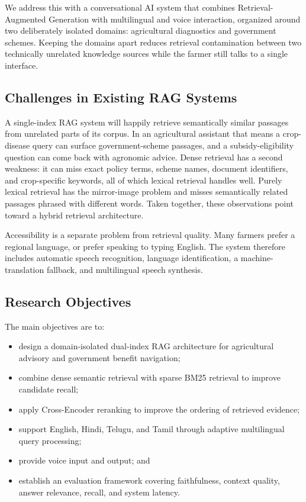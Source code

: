 \documentclass[10pt,twocolumn,letterpaper]{article}
\begin{document}
We address this with a conversational AI system that combines Retrieval-Augmented Generation with multilingual and voice interaction, organized around two deliberately isolated domains: agricultural diagnostics and government schemes. Keeping the domains apart reduces retrieval contamination between two technically unrelated knowledge sources while the farmer still talks to a single interface.

\subsection{Challenges in Existing RAG Systems}
A single-index RAG system will happily retrieve semantically similar passages from unrelated parts of its corpus. In an agricultural assistant that means a crop-disease query can surface government-scheme passages, and a subsidy-eligibility question can come back with agronomic advice. Dense retrieval has a second weakness: it can miss exact policy terms, scheme names, document identifiers, and crop-specific keywords, all of which lexical retrieval handles well. Purely lexical retrieval has the mirror-image problem and misses semantically related passages phrased with different words. Taken together, these observations point toward a hybrid retrieval architecture.

Accessibility is a separate problem from retrieval quality. Many farmers prefer a regional language, or prefer speaking to typing English. The system therefore includes automatic speech recognition, language identification, a machine-translation fallback, and multilingual speech synthesis.

\subsection{Research Objectives}
The main objectives are to:
\begin{itemize}\itemsep1pt
\item design a domain-isolated dual-index RAG architecture for agricultural advisory and government benefit navigation;
\item combine dense semantic retrieval with sparse BM25 retrieval to improve candidate recall;
\item apply Cross-Encoder reranking to improve the ordering of retrieved evidence;
\item support English, Hindi, Telugu, and Tamil through adaptive multilingual query processing;
\item provide voice input and output; and
\item establish an evaluation framework covering faithfulness, context quality, answer relevance, recall, and system latency.
\end{itemize}
\end{document}
